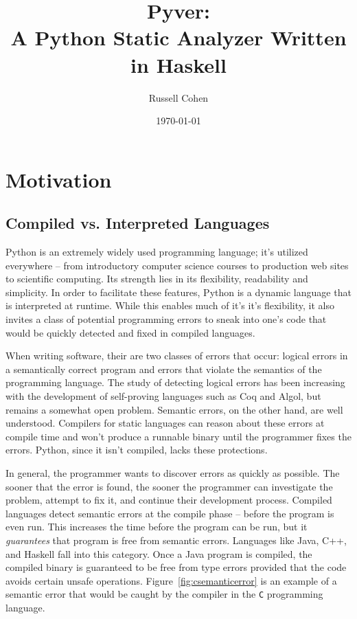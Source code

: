 \documentclass{article}[12pt]
\author{Russell Cohen}
\title{Pyver: \\ A Python Static Analyzer Written in Haskell}
\date{\today}
\begin{document}
\renewcommand{\theFancyVerbLine}{
      \sffamily\textcolor[rgb]{0.5,0.5,0.5}{\scriptsize\arabic{FancyVerbLine}}}

\maketitle
\section{Motivation}

\subsection{Compiled vs. Interpreted Languages}
\doublespacing

Python is an extremely widely used programming language; it's utilized everywhere -- from
introductory computer science courses to production web sites to scientific computing. Its strength
lies in its flexibility, readability and simplicity. In order to facilitate these features, Python
is a dynamic language that is interpreted at runtime. While this enables much of it's it's
flexibility, it also invites a class of potential programming errors to sneak into one's code that
would be quickly detected and fixed in compiled languages.

When writing software, their are two classes of errors that occur: logical errors in a semantically correct program and
errors that violate the semantics of the programming language. The study of detecting logical errors has been
increasing with the development of self-proving languages such as Coq and Algol, but remains a somewhat open problem.
Semantic errors, on the other hand, are well understood. Compilers for static languages can reason about these
errors at compile time and won't produce a runnable binary until the programmer fixes the errors. Python, since it isn't
compiled, lacks these protections.

In general, the programmer wants to discover errors as quickly as possible. The sooner that the
error is found, the sooner the programmer can investigate the problem, attempt to fix it, and
continue their development process. Compiled languages detect semantic errors at the compile phase
-- before the program is even run. This increases the time before the program can be run, but it
\emph{guarantees} that program is free from semantic errors. Languages like Java, C++, and Haskell
fall into this category. Once a Java program is compiled, the compiled binary is guaranteed to be
free from type errors provided that the code avoids certain unsafe operations.
Figure~\ref{fig:csemanticerror} is an example of a semantic error that would be caught by the
compiler in the \texttt{C} programming language. 
\end{document}
